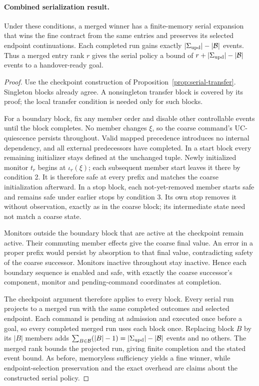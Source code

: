 \paragraph{Combined serialization result.}
Under these conditions, a merged winner has a finite-memory serial expansion that wins the fine contract from the same entries and preserves its selected endpoint continuations. Each completed run gains exactly $|\Sigma_{\mathrm{upd}}|-|\mathcal B|$ events. Thus a merged entry rank $r$ gives the serial policy a bound of $r+|\Sigma_{\mathrm{upd}}|-|\mathcal B|$ events to a handover-ready goal.
\begin{proof}
Use the checkpoint construction of Proposition~\ref{prop:serial-transfer}. Singleton blocks already agree. A nonsingleton transfer block is covered by its proof; the local transfer condition is needed only for such blocks.

For a boundary block, fix any member order and disable other controllable events until the block completes. No member changes $\xi$, so the coarse command's UC-quiescence persists throughout. Valid mapped precedence introduces no internal dependency, and all external predecessors have completed. In a start block every remaining initializer stays defined at the unchanged tuple. Newly initialized monitor $t_r$ begins at $\iota_r(\xi)$; each subsequent member start leaves it there by condition 2. It is therefore safe at every prefix and matches the coarse initialization afterward. In a stop block, each not-yet-removed member starts safe and remains safe under earlier stops by condition 3. Its own stop removes it without observation, exactly as in the coarse block; its intermediate state need not match a coarse state.

Monitors outside the boundary block that are active at the checkpoint remain active. Their commuting member effects give the coarse final value. An error in a proper prefix would persist by absorption to that final value, contradicting safety of the coarse successor. Monitors inactive throughout stay inactive. Hence each boundary sequence is enabled and safe, with exactly the coarse successor's component, monitor and pending-command coordinates at completion.

The checkpoint argument therefore applies to every block. Every serial run projects to a merged run with the same completed outcomes and selected endpoint. Each command is pending at admission and executed once before a goal, so every completed merged run uses each block once. Replacing block $B$ by its $|B|$ members adds $\sum_{B\in\mathcal B}(|B|-1)=|\Sigma_{\mathrm{upd}}|-|\mathcal B|$ events and no others. The merged rank bounds the projected run, giving finite completion and the stated event bound. As before, memoryless sufficiency yields a fine winner, while endpoint-selection preservation and the exact overhead are claims about the constructed serial policy.
\end{proof}

